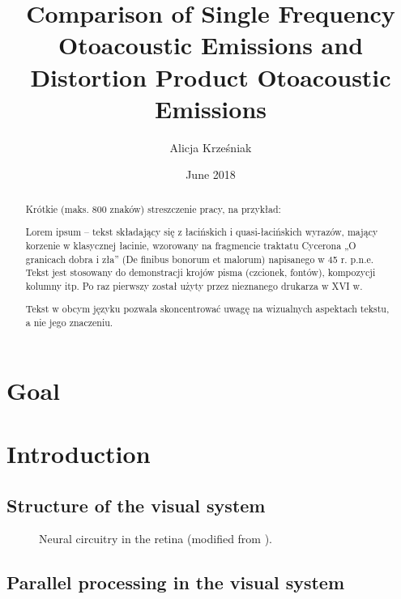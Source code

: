 \documentclass{pracalicmgr}
\author{Alicja Krześniak}
\title{Comparison of Single Frequency Otoacoustic Emissions and Distortion Product Otoacoustic Emissions}
\date{June 2018}
\begin{document}
    \maketitle
    \let\cleardoublepage\clearpage
    
    \begin{abstract}
Krótkie (maks. 800 znaków) streszczenie pracy, na przykład:

Lorem ipsum – tekst składający się z łacińskich i quasi-łacińskich wyrazów, mający korzenie w klasycznej łacinie, wzorowany na fragmencie traktatu Cycerona „O granicach dobra i zła” (De finibus bonorum et malorum) napisanego w 45 r. p.n.e. Tekst jest stosowany do demonstracji krojów pisma (czcionek, fontów), kompozycji kolumny itp. Po raz pierwszy został użyty przez nieznanego drukarza w XVI w.

Tekst w obcym języku pozwala skoncentrować uwagę na wizualnych aspektach tekstu, a nie jego znaczeniu.


     \end{abstract}

  
    \tableofcontents
    
    \chapter*{Goal}
    
    \chapter{Introduction}
    
    \section{Structure of the visual system}

    \begin{figure}[htbp]
    	\begin{center}
    		
    	\end{center}
    	\caption{Neural circuitry in the retina (modified from \cite{carlsonphysiology}).}
    	\label{rys:neural_circuitry}
    \end{figure}      

   \section{Parallel processing in the visual system}
\end{document}

